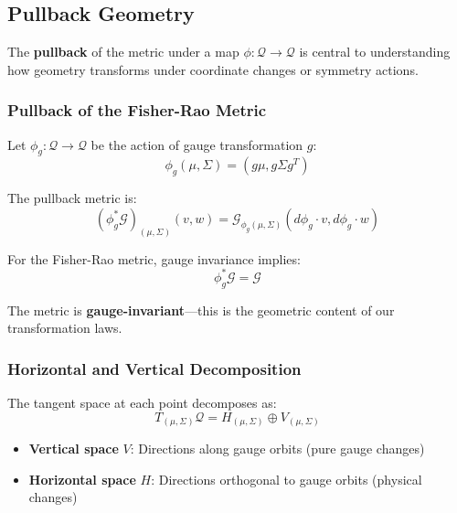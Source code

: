 \documentclass[12pt]{article}
\begin{document}
\subsection{Pullback Geometry}

The \textbf{pullback} of the metric under a map $\phi: \mathcal{Q} \to \mathcal{Q}$ is central to understanding how geometry transforms under coordinate changes or symmetry actions.

\subsubsection{Pullback of the Fisher-Rao Metric}

Let $\phi_g: \mathcal{Q} \to \mathcal{Q}$ be the action of gauge transformation $g$:
\begin{equation}
\phi_g(\mu, \Sigma) = (g\mu, g\Sigma g^T)
\end{equation}

The pullback metric is:
\begin{equation}
(\phi_g^*\mathcal{G})_{(\mu,\Sigma)}(v, w) = \mathcal{G}_{\phi_g(\mu,\Sigma)}(d\phi_g \cdot v, d\phi_g \cdot w)
\end{equation}

For the Fisher-Rao metric, gauge invariance implies:
\begin{equation}
\boxed{\phi_g^*\mathcal{G} = \mathcal{G}}
\end{equation}

The metric is \textbf{gauge-invariant}---this is the geometric content of our transformation laws.

\subsubsection{Horizontal and Vertical Decomposition}

The tangent space at each point decomposes as:
\begin{equation}
T_{(\mu,\Sigma)}\mathcal{Q} = H_{(\mu,\Sigma)} \oplus V_{(\mu,\Sigma)}
\end{equation}

\begin{itemize}
    \item \textbf{Vertical space} $V$: Directions along gauge orbits (pure gauge changes)
    \item \textbf{Horizontal space} $H$: Directions orthogonal to gauge orbits (physical changes)
\end{itemize}
\end{document}
